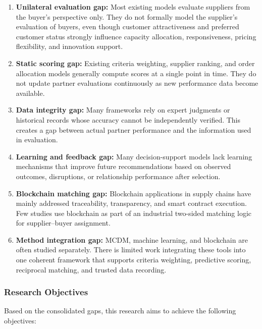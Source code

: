 \documentclass[11pt]{article}
\begin{document}
\begin{enumerate}
\item \textbf{Unilateral evaluation gap:} Most existing models evaluate suppliers from the buyer's perspective only. They do not formally model the supplier's evaluation of buyers, even though customer attractiveness and preferred customer status strongly influence capacity allocation, responsiveness, pricing flexibility, and innovation support.
\item \textbf{Static scoring gap:} Existing criteria weighting, supplier ranking, and order allocation models generally compute scores at a single point in time. They do not update partner evaluations continuously as new performance data become available.
\item \textbf{Data integrity gap:} Many frameworks rely on expert judgments or historical records whose accuracy cannot be independently verified. This creates a gap between actual partner performance and the information used in evaluation.
\item \textbf{Learning and feedback gap:} Many decision-support models lack learning mechanisms that improve future recommendations based on observed outcomes, disruptions, or relationship performance after selection.
\item \textbf{Blockchain matching gap:} Blockchain applications in supply chains have mainly addressed traceability, transparency, and smart contract execution. Few studies use blockchain as part of an industrial two-sided matching logic for supplier--buyer assignment.
\item \textbf{Method integration gap:} MCDM, machine learning, and blockchain are often studied separately. There is limited work integrating these tools into one coherent framework that supports criteria weighting, predictive scoring, reciprocal matching, and trusted data recording.
\end{enumerate}

\subsubsection{Research Objectives}

Based on the consolidated gaps, this research aims to achieve the following objectives:
\end{document}

